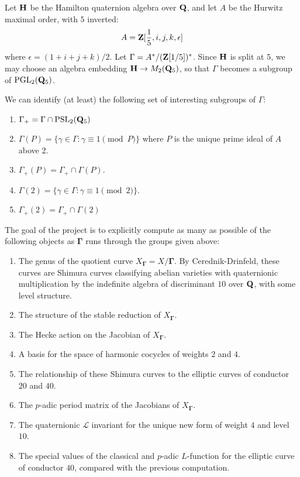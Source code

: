 \documentclass{article}
\def\PSL{\mathrm{PSL}}
\def\Z{{\bf Z}}
\def\Q{{\bf Q}}
\def\PGL{\mathrm{PGL}}
\begin{document}
Let ${\bf H}$ be the Hamilton quaternion algebra over ${\bf Q}$, and
let $A$ be the Hurwitz maximal order, with $5$ inverted:
$$
A={\bf Z}[\frac{1}{5},i,j,k,\epsilon]
$$
where $\epsilon=(1+i+j+k)/2$. Let $\Gamma=A^{*}/(\Z[1/5])^*$. Since
${\bf H}$ is split at $5$, we may choose an algebra embedding ${\bf
H}\to M_{2}(\Q_5)$, so that $\Gamma$ becomes a subgroup of
$\PGL_{2}(\Q_5)$.

We can identify (at least)  the following set of interesting
subgroups of $\Gamma$:
\begin{enumerate}
\item $\Gamma_{+}=\Gamma\cap\PSL_{2}(\Q_5)$
\item $\Gamma(P)=\{\gamma\in\Gamma : \gamma\equiv 1\pmod P\}$ where
$P$ is the unique prime ideal of $A$ above $2$.
\item $\Gamma_{+}(P)=\Gamma_{+}\cap\Gamma(P).$
\item $\Gamma(2)=\{\gamma\in\Gamma : \gamma\equiv 1\pmod 2\}$.
\item $\Gamma_{+}(2)=\Gamma_{+}\cap\Gamma(2)$
\end{enumerate}


The goal of the project is to explicitly compute as many as possible
of the following objects as $\mathbf{\Gamma}$ runs through the
groups given above:
\begin{enumerate}
\item The genus of the quotient curve
$X_{\mathbf{\Gamma}}=X/\mathbf{\Gamma}$. By Cerednik-Drinfeld, these
curves are Shimura curves classifying abelian varieties with
quaternionic multiplication by the indefinite algebra of
discriminant $10$ over ${\bf Q}$, with some level structure.
\item The structure of the stable reduction of
$X_{\mathbf{\Gamma}}$.
\item The Hecke action on the Jacobian of $X_{\mathbf{\Gamma}}$.
\item A basis for the space of harmonic cocycles of weights $2$ and
$4$.
\item The relationship of these Shimura curves to the elliptic
curves of conductor $20$ and $40$.
\item The $p$-adic period matrix of the Jacobians of
$X_{\mathbf{\Gamma}}$.
\item The quaternionic $\mathcal{L}$ invariant for the unique new
form of weight $4$ and level $10$.
\item The special values of the classical and $p$-adic $L$-function
for the elliptic curve of conductor $40$, compared with the previous
computation.
\end{enumerate}
\end{document}
